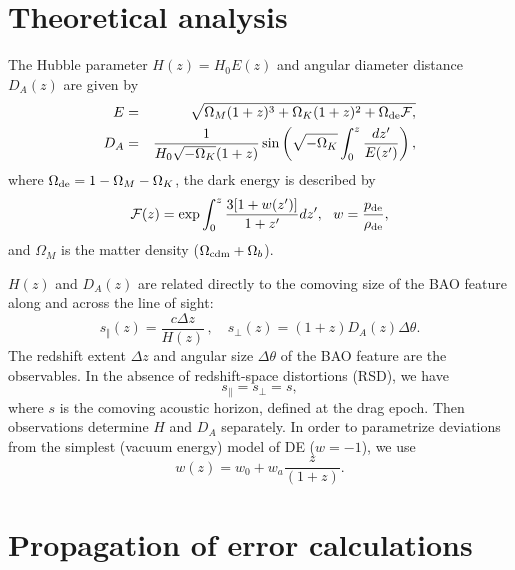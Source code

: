 \documentclass[useAMS,usenatbib]{mn2e}
\begin{document}
\section{Theoretical analysis}\label{theoretical_analysis}


The Hubble parameter $H(z)=H_0E(z)$ and
 angular diameter distance $D_A(z)$ are given by
\begin{eqnarray}\label{EzandDz}
E&=& \sqrt{\Omega_M (1+z)^3 + \Omega_K(1+ z)^2+ 
   \Omega_{\rm de} \mathcal{F},}\\
D_{A}&=& \frac{1}{H_0\sqrt{-\Omega_K}(1+z)}\sin\left(\sqrt{-\Omega_K} \int_0^z \frac{dz'}{E(z')}\right),
\end{eqnarray}
where $\Omega_{\rm de}  = 1- \Omega_M - \Omega_K $, the dark energy is described by
\begin{equation}\label{Fz}
\mathcal{F}(z)=\exp {\int_0^z \frac{3[1+w(z')]}{1+z'}dz'} , ~~ w={p_{\rm de}\over \rho_{\rm de}},
\end{equation}
and $\Omega_M$ is the matter density ($\Omega_{{\rm cdm}} + \Omega_b$).

$H(z)$ and $D_{A}(z)$ are related directly to the comoving size of the BAO feature along and across the line of sight: 
\begin{equation}\label{DandH}
s_\Vert(z) =\frac{c \Delta z}{H(z)}\,,  \quad s_\perp(z) = (1+z) D_{A}(z) \Delta \theta.
\end{equation}
The redshift extent $\Delta z$ and angular size $\Delta \theta$ of the BAO feature are the observables. In the absence of redshift-space distortions (RSD), we have
\begin{equation}
s_\|=s_\perp=s,
\end{equation} 
where $s$ is the comoving acoustic horizon, defined at the drag epoch. Then observations determine $H$ and $D_A$ separately.
 In order to parametrize deviations from the simplest (vacuum energy) model of DE ($w=-1$), we use \citep{Chevallier:2000qy, Linder:2003nc} \begin{equation}
w(z) = w_0 + w_a \frac{z}{(1+z)}.
\label{wz}
\end{equation}


\section{Propagation of error calculations}
\end{document}
